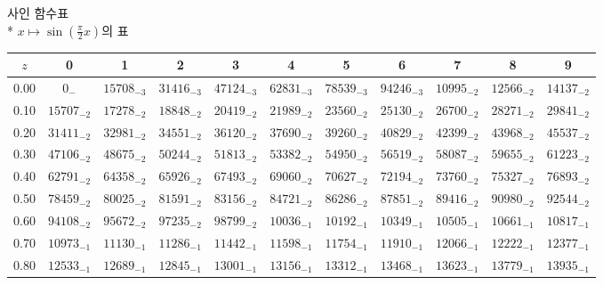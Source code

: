 \documentclass[10pt, a4paper]{article}
\begin{document}
\pagebreak
\begin{center}
    \huge{사인 함수표}\normalsize\\
    * \(x \longmapsto \sin\left(\frac{\pi}{2}x\right)\)의 표
    \begin{longtable}{c || c c c c c | c c c c c}
        \(z\) & 0 & 1 & 2 & 3 & 4 & 5 & 6 & 7 & 8 & 9\\
        \hline\hline
        0.00 & \({0}_{-}\) & \({15708}_{-3}\) & \({31416}_{-3}\) & \({47124}_{-3}\) & \({62831}_{-3}\) & \({78539}_{-3}\) & \({94246}_{-3}\) & \({10995}_{-2}\) & \({12566}_{-2}\) & \({14137}_{-2}\)\\
        0.10 & \({15707}_{-2}\) & \({17278}_{-2}\) & \({18848}_{-2}\) & \({20419}_{-2}\) & \({21989}_{-2}\) & \({23560}_{-2}\) & \({25130}_{-2}\) & \({26700}_{-2}\) & \({28271}_{-2}\) & \({29841}_{-2}\)\\
        0.20 & \({31411}_{-2}\) & \({32981}_{-2}\) & \({34551}_{-2}\) & \({36120}_{-2}\) & \({37690}_{-2}\) & \({39260}_{-2}\) & \({40829}_{-2}\) & \({42399}_{-2}\) & \({43968}_{-2}\) & \({45537}_{-2}\)\\
        0.30 & \({47106}_{-2}\) & \({48675}_{-2}\) & \({50244}_{-2}\) & \({51813}_{-2}\) & \({53382}_{-2}\) & \({54950}_{-2}\) & \({56519}_{-2}\) & \({58087}_{-2}\) & \({59655}_{-2}\) & \({61223}_{-2}\)\\
        0.40 & \({62791}_{-2}\) & \({64358}_{-2}\) & \({65926}_{-2}\) & \({67493}_{-2}\) & \({69060}_{-2}\) & \({70627}_{-2}\) & \({72194}_{-2}\) & \({73760}_{-2}\) & \({75327}_{-2}\) & \({76893}_{-2}\)\\
        0.50 & \({78459}_{-2}\) & \({80025}_{-2}\) & \({81591}_{-2}\) & \({83156}_{-2}\) & \({84721}_{-2}\) & \({86286}_{-2}\) & \({87851}_{-2}\) & \({89416}_{-2}\) & \({90980}_{-2}\) & \({92544}_{-2}\)\\
        0.60 & \({94108}_{-2}\) & \({95672}_{-2}\) & \({97235}_{-2}\) & \({98799}_{-2}\) & \({10036}_{-1}\) & \({10192}_{-1}\) & \({10349}_{-1}\) & \({10505}_{-1}\) & \({10661}_{-1}\) & \({10817}_{-1}\)\\
        0.70 & \({10973}_{-1}\) & \({11130}_{-1}\) & \({11286}_{-1}\) & \({11442}_{-1}\) & \({11598}_{-1}\) & \({11754}_{-1}\) & \({11910}_{-1}\) & \({12066}_{-1}\) & \({12222}_{-1}\) & \({12377}_{-1}\)\\
        0.80 & \({12533}_{-1}\) & \({12689}_{-1}\) & \({12845}_{-1}\) & \({13001}_{-1}\) & \({13156}_{-1}\) & \({13312}_{-1}\) & \({13468}_{-1}\) & \({13623}_{-1}\) & \({13779}_{-1}\) & \({13935}_{-1}\)\\

\end{longtable}
\end{center}
\end{document}

